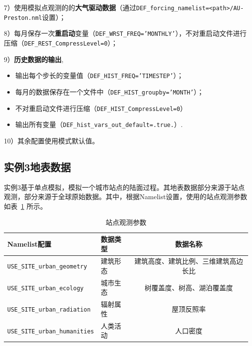 \par
7）使用模拟点观测的的\textbf{大气驱动数据}（通过\texttt{DEF\_forcing\_namelist=<path>/AU-Preston.nml}设置）；\par
8）每月保存一次\textbf{重启动}变量（\texttt{DEF\_WRST\_FREQ='MONTHLY'}），不对重启动文件进行压缩（\texttt{DEF\_\allowbreak REST\_\allowbreak CompressLevel=0}）；\par
9）\textbf{历史数据的输出},
\begin{itemize}[nosep,leftmargin=4em]
    \item 输出每个步长的变量值（\texttt{DEF\_HIST\_FREQ='TIMESTEP'}）；
    \item 每月的数据保存在一个文件中（\texttt{DEF\_HIST\_groupby='MONTH'}）；
    \item 不对重启动文件进行压缩（\texttt{DEF\_HIST\_CompressLevel=0}）
    \item 输出所有变量（\texttt{DEF\_hist\_vars\_out\_default=.true.}）.
\end{itemize} \par
10）其余配置使用模式默认值。

\subsection{实例3地表数据}

实例3基于单点模拟，模拟一个城市站点的陆面过程。其地表数据部分来源于站点观测，部分来源于全球原始数据。其中，根据Namelist设置，使用的站点观测参数如表~\ref{ex3table_para} 所示。

\begin{table}[htbp]
\caption{站点观测参数}
\centering \renewcommand{\arraystretch}{1.5}
\label{ex3table_para}
\begin{tabular}{llc}
\toprule
\textbf{Namelist配置} & \textbf{数据类型} & \textbf{数据名称} \\

\midrule

\texttt{USE\_SITE\_urban\_geometry} & 建筑形态 & 建筑高度、建筑比例、三维建筑高边长比  \\
\texttt{USE\_SITE\_urban\_ecology} & 城市生态 & 树覆盖度、树高、湖泊覆盖度 \\
\texttt{USE\_SITE\_urban\_radiation} & 辐射属性 & 屋顶反照率  \\
\texttt{USE\_SITE\_urban\_humanities} & 人类活动 & 人口密度  \\

\bottomrule
\end{tabular}
\end{table}

